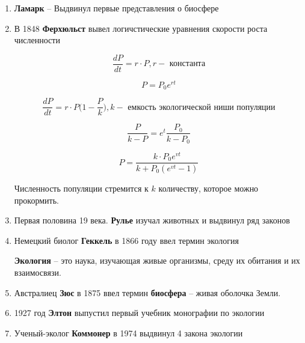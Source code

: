 \begin{enumerate}
    \item \textbf{Ламарк} -- Выдвинул первые представления о биосфере
    \item В 1848 \textbf{Ферхюльст} вывел логичстические
        уравнения скорости роста численности

        \begin{equation*}
            \frac{dP}{dt} = r \cdot P,
            r - \text{ константа}
        \end{equation*}

        \begin{equation*}
            P = P_0 e^{rt}
        \end{equation*}

        \begin{equation*}
            \frac{dP}{dt} = r \cdot P \bigg( 1 - \frac{P}{k} \bigg),
            k - \text{ емкость экологической ниши популяции}
        \end{equation*}

        \begin{equation*}
            \frac{P}{k-P} = e^t \frac{P_0}{k - P_0}
        \end{equation*}

        \begin{equation*}
            P = \frac{k \cdot P_0 e^{vt}}{k + P_0 (e^{vt} - 1)}
        \end{equation*}

        Численность популяции стремится  к $k$ количеству, которое
        можно прокормить.

    \item Первая половина 19 века. \textbf{Рулье} изучал животных и
        выдвинул ряд законов

    \item Немецкий биолог \textbf{Геккель} в 1866 году ввел
        термин экология

        \textbf{Экология} -- это наука, изучающая живые организмы,
        среду их обитания и их взаимосвязи.

    \item Австралиец \textbf{Зюс} в 1875 ввел термин \textbf{биосфера}
        -- живая оболочка Земли.

    \item 1927 год \textbf{Элтон} выпустил первый учебник
        монографии по экологии

    \item Ученый-эколог \textbf{Коммонер} в 1974 выдвинул
        4 закона экологии


\end{enumerate}
